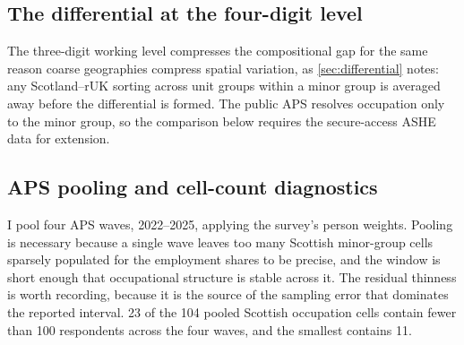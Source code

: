 \subsection{The differential at the four-digit level}

The three-digit working level compresses the compositional gap for the same reason coarse geographies compress spatial variation, as \cref{sec:differential} notes: any Scotland--rUK sorting across unit groups within a minor group is averaged away before the differential is formed. The public APS resolves occupation only to the minor group, so the comparison below requires the secure-access ASHE data for extension.



\subsection{APS pooling and cell-count diagnostics}

I pool four APS waves, 2022--2025, applying the survey's person weights. Pooling is necessary because a single wave leaves too many Scottish minor-group cells sparsely populated for the employment shares to be precise, and the window is short enough that occupational structure is stable across it. The residual thinness is worth recording, because it is the source of the sampling error that dominates the reported interval. 23 of the 104 pooled Scottish occupation cells contain fewer than 100 respondents across the four waves, and the smallest contains 11. 

 
